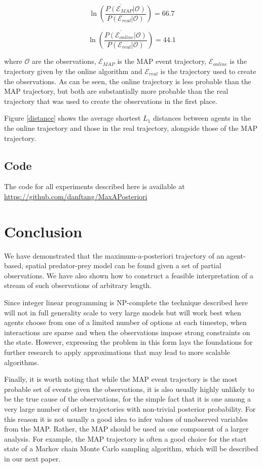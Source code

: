 \documentclass{article}
\begin{document}
\[
\overline{\ln\left(\frac{P(\mathcal{E}_{MAP}|\mathcal{O})}{P(\mathcal{E}_{real}|\mathcal{O})}\right)} = 66.7
\]

\[
\overline{\ln\left(\frac{P(\mathcal{E}_{online}|\mathcal{O})}{P(\mathcal{E}_{real}|\mathcal{O})}\right)} = 44.1
\]

where $\mathcal{O}$ are the observations, $\mathcal{E}_{MAP}$ is the MAP event trajectory, $\mathcal{E}_{online}$ is the trajectory given by the online algorithm and $\mathcal{E}_{real}$ is the trajectory used to create the observations. As can be seen, the online trajectory is less probable than the MAP trajectory, but both are substantially more probable than the real trajectory that was used to create the observations in the first place.

Figure \ref{distance} shows the average shortest $L_1$ distances between agents in the the online trajectory and those in the real trajectory, alongside those of the MAP trajectory.

\subsection{Code}

The code for all experiments described here is available at \href{https://github.com/danftang/MaxAPosteriori}{https://github.com/danftang/MaxAPosteriori}

\section{Conclusion}

We have demonstrated that the maximum-a-posteriori trajectory of an agent-based, spatial predator-prey model can be found given a set of partial observations. We have also shown how to construct a feasible interpretation of a stream of such observations of arbitrary length.

Since integer linear programming is NP-complete the technique described here will not in full generality scale to very large models but will work best when agents choose from one of a limited number of options at each timestep, when interactions are sparse and when the observations impose strong constraints on the state. However, expressing the problem in this form lays the foundations for further research to apply approximations that may lead to more scalable algorithms.

Finally, it is worth noting that while the MAP event trajectory is the most probable set of events given the observations, it is also usually highly unlikely to be the true cause of the observations, for the simple fact that it is one among a very large number of other trajectories with non-trivial posterior probability. For this reason it is not usually a good idea to infer values of unobserved variables from the MAP. Rather, the MAP should be used as one component of a larger analysis. For example, the MAP trajectory is often a good choice for the start state of a Markov chain Monte Carlo sampling algorithm, which will be described in our next paper.

%
% 


\end{document}
